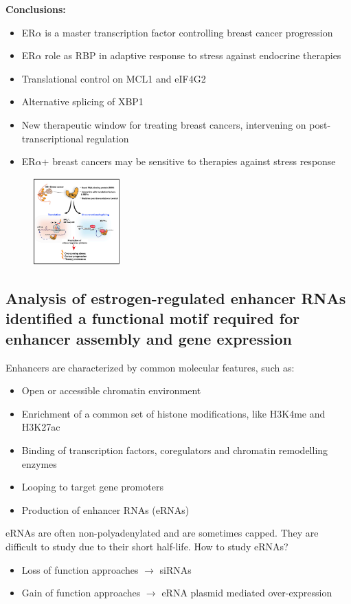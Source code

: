 \textbf{Conclusions:}
\begin{itemize}
\tightlist
\item ER$\alpha$ is a master transcription factor controlling breast cancer progression
\item ER$\alpha$ role as RBP in adaptive response to stress against endocrine therapies 
\item Translational control on MCL1 and eIF4G2
\item Alternative splicing of XBP1
\item New therapeutic window for treating breast cancers, intervening on post-transcriptional regulation
\item ER$\alpha$+ breast cancers may be sensitive to therapies against stress response 
\end{itemize}

\begin{figure}
\centering
\includegraphics[width=0.3\textwidth]{../_resources/era.png}
\caption{}
\end{figure}

\subsection{Analysis of estrogen-regulated enhancer RNAs identified a functional motif required for enhancer assembly and gene expression}
Enhancers are characterized by common molecular features, such as: 
\begin{itemize}
\tightlist
\item Open or accessible chromatin environment 
\item Enrichment of a common set of histone modifications, like H3K4me and H3K27ac 
\item Binding of transcription factors, coregulators and chromatin remodelling enzymes 
\item Looping to target gene promoters  
\item Production of enhancer RNAs (eRNAs)
\end{itemize}

eRNAs are often non-polyadenylated and are sometimes capped.  They are difficult to study due to their short half-life. 
How to study eRNAs? 
\begin{itemize}
\tightlist
\item Loss of function approaches $\rightarrow$ siRNAs 
\item Gain of function approaches  $\rightarrow$  eRNA plasmid mediated over-expression
\end{itemize}

